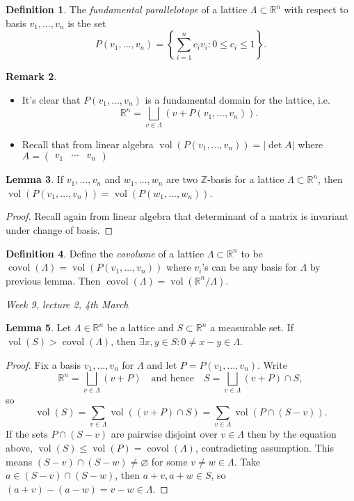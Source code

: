 \documentclass{article}
\newcommand{\Z}{\mathbb{Z}}
\newcommand{\R}{\mathbb{R}}
\newcommand{\vol}{\operatorname{vol}}
\newcommand{\covol}{\operatorname{covol}}
\theoremstyle{definition}
\newtheorem{defn}{Definition}[subsection]
\newtheorem{lemma}[defn]{Lemma}
\newtheorem{remark}[defn]{Remark}
\begin{document}
\begin{defn}
The \textit{fundamental parallelotope} of a lattice $\Lambda\subset\R^n$ with respect to basis $v_1,\ldots,v_n$ is the set
\[
P(v_1,\ldots,v_n)=\left\{\sum_{i=1}^n c_iv_i:0\leq c_i\leq 1\right\}.
\]
\end{defn}
\begin{remark}
\begin{itemize}
\item It's clear that $P(v_1,\ldots,v_n)$ is a fundamental domain for the lattice, i.e.
\[
\R^n=\bigsqcup_{v\in\Lambda}(v+P(v_1,\ldots,v_n)).
\]
\item Recall that from linear algebra $\vol(P(v_1,\ldots,v_n))=|\!\det A|$ where $A=\begin{pmatrix}v_1 & \cdots & v_n\end{pmatrix}$
\end{itemize}
\end{remark}

\begin{lemma}
If $v_1,\ldots,v_n$ and $w_1,\ldots,w_n$ are two $\Z$-basis for a lattice $\Lambda\subset\R^n$, then $\vol(P(v_1,\ldots,v_n))=\vol(P(w_1,\ldots,w_n))$.
\end{lemma}
\begin{proof}
Recall again from linear algebra that determinant of a matrix is invariant under change of basis.
\end{proof}

\begin{defn}
Define the \textit{covolume} of a lattice $\Lambda\subset\R^n$ to be $\covol(\Lambda)=\vol(P(v_1,\ldots,v_n))$ where $v_i$'s can be any basis for $\Lambda$ by previous lemma. Then $\covol(\Lambda)=\vol(\R^n/\Lambda)$.
\end{defn}

\begin{flushright}
\textit{Week 9, lecture 2, 4th March}
\end{flushright}

\begin{lemma}
Let $\Lambda\in\R^n$ be a lattice and $S\subset\R^n$ a measurable set. If $\vol(S)>\covol(\Lambda)$, then $\exists x,y\in S:0\neq x-y\in\Lambda$.
\end{lemma}
\begin{proof}
Fix a basis $v_1,\ldots,v_n$ for $\Lambda$ and let $P=P(v_1,\ldots,v_n)$. Write
\[
\R^n=\bigsqcup_{v\in\Lambda}(v+P)\quad\text{and hence}\quad S=\bigsqcup_{v\in\Lambda}(v+P)\cap S,
\]
so
\[
\vol(S)=\sum_{v\in\Lambda}\vol((v+P)\cap S)=\sum_{v\in\Lambda}\vol(P\cap(S-v)).
\]
If the sets $P\cap (S-v)$ are pairwise disjoint over $v\in\Lambda$ then by the equation above, $\vol(S)\leq\vol(P)=\covol(\Lambda)$, contradicting assumption. This means $(S-v)\cap (S-w)\neq\varnothing$ for some $v\neq w\in\Lambda$. Take $a\in (S-v)\cap (S-w)$, then $a+v,a+w\in S$, so $(a+v)-(a-w)=v-w\in\Lambda$.
\end{proof}
\end{document}
